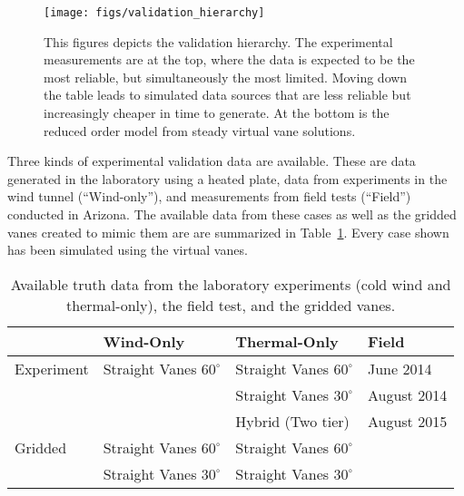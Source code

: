 %
%
 \begin{figure}[!htb]
   \begin{center}
    \texttt{[image: figs/validation\_hierarchy]}
    \caption{This figures depicts the validation hierarchy. The
    experimental measurements 
    are at the top, where the data is expected to be the most reliable,
    but simultaneously the most limited. Moving down the table leads to
    simulated data sources that are less reliable but increasingly
    cheaper in time to generate. At the bottom is the reduced order
    model from steady virtual vane solutions.} 
    \label{fig:val_hier}
   \end{center}
 \end{figure}

Three kinds of experimental validation data are available. These are
data generated in the laboratory using a heated plate, data from
experiments in the wind tunnel (``Wind-only''), and measurements from field
tests (``Field'') conducted in Arizona. The available data from
these cases as well as the gridded vanes created to mimic them are are
summarized in Table~\ref{tab:val_data}. Every case shown has been
simulated using the virtual vanes.   

\begin{table}[h]
\centering
\label{my-label}
\begin{tabular}{l|l|l|l|}
           & Wind-Only                   & Thermal-Only                & Field  \\
  \hline 
Experiment & Straight Vanes $60^{\circ}$ & Straight Vanes $60^{\circ}$ & June 2014   \\
           &                           & Straight Vanes $30^{\circ}$   & August 2014 \\
           &                           & Hybrid (Two tier)             & August 2015 \\
  \hline 
Gridded    & Straight Vanes $60^{\circ}$ & Straight Vanes $60^{\circ}$ & \\
           & Straight Vanes $30^{\circ}$ & Straight Vanes $30^{\circ}$ & \\
  \hline 
\end{tabular}
  \caption{Available truth data from the laboratory experiments 
    (cold wind and thermal-only), the field test, and the gridded vanes.} 
  \label{tab:val_data}
\end{table}
%
%
%
%
%

%
%

